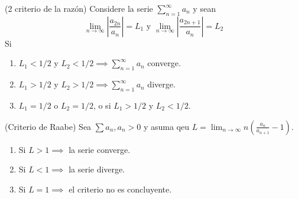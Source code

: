 \begin{teorema} (2 criterio de la razón)
	Considere la serie $\sum_{n=1}^{\infty}a_n$ y sean 
	$$\lim_{n\to\infty}\left|\frac{a_{2n}}{a_n}\right|=L_1 \text{ y } \lim_{n\to\infty}\left|\frac{a_{2n+1}}{a_n}\right|=L_2$$
	Si 
	\begin{enumerate}
		\item $L_1<1/2$ y $L_2<1/2\implies \sum_{n=1}^\infty a_n$ converge. 
		\item $L_1>1/2$ y $L_2>1/2 \implies \sum_{n=1}^{\infty}a_n$ diverge.
		\item $L_1=1/2$ o $L_2=1/2$, o si $L_1>1/2$ y $L_2<1/2$. 
	\end{enumerate}
\end{teorema}

\begin{teorema}(Criterio de Raabe)
	Sea $\sum a_n, a_n>0$ y asuma qeu $L=\lim_{n\to\infty}n\left(\frac{a_n}{a_{n+1}}-1\right)$. 
	\begin{enumerate}
		\item Si $L>1\implies$ la serie converge. 
		\item Si $L<1\implies$ la serie diverge. 
		\item Si $L=1\implies$ el criterio no es concluyente. 
	\end{enumerate}
\end{teorema}


